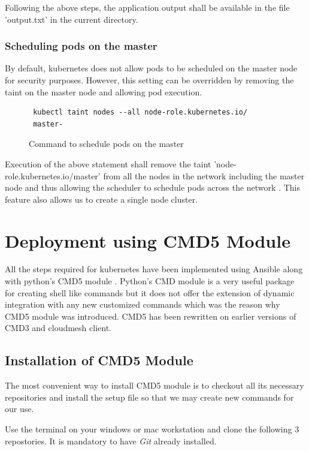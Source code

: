 \documentclass[9pt,twocolumn,twoside]{../../styles/osajnl}
\begin{document}
\noindent
Following the above steps, the application output shall be available
in the file 'output.txt' in the current directory.


\subsubsection{Scheduling pods on the master}
By default, kubernetes does not allow pods to be
scheduled on the master node for security purposes. However, this
setting can be overridden by removing the taint on the master node and
allowing pod execution.
\begin{figure}[H]
\begin{verbatim}
 kubectl taint nodes --all node-role.kubernetes.io/
 master-
\end{verbatim}
\caption{Command to schedule pods on the master}
\vspace{-4mm}
\label{Command to schedule pods on the master}
\end{figure}

\noindent
Execution of the above statement shall remove the taint
'node-role.kubernetes.io/master' from all the nodes in the network
including the master node and thus allowing the scheduler to schedule
pods across the network \cite{www-kubernetes-kubeadm}. This feature
also allows us to create a single node cluster.

\section{Deployment using CMD5 Module}
All the steps required for kubernetes have been implemented using
Ansible along with python's CMD5 module \cite{www-cmd5}. Python's
CMD module is a very useful package for creating shell like commands
but it does not offer the extension of dynamic integration with any
new customized commands which was the reason why CMD5 module was
introduced. CMD5 has been rewritten on earlier versions of CMD3 and
cloudmesh client.

\subsection{Installation of CMD5 Module}
The most convenient way to install CMD5 module is to checkout all its
necessary repositories and install the setup file so that we may
create new commands for our use.

\noindent
Use the terminal on your windows or mac workstation and clone the
following 3 repostories. It is mandatory to have \emph{Git}
\cite{www-git} already installed.
\end{document}
